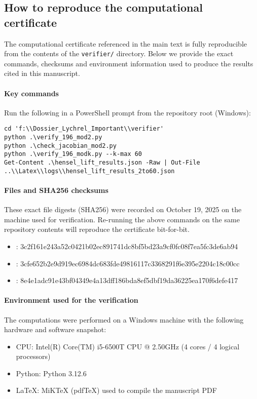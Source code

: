 \documentclass[12pt,a4paper]{article}
\begin{document}
\subsection*{How to reproduce the computational certificate}
The computational certificate referenced in the main text is fully reproducible
from the contents of the \texttt{verifier/} directory. Below we provide the
exact commands, checksums and environment information used to produce the
results cited in this manuscript.

\paragraph{Key commands}
Run the following in a PowerShell prompt from the repository root (Windows):
\begin{verbatim}
cd 'f:\\Dossier_Lychrel_Important\\verifier'
python .\verify_196_mod2.py
python .\check_jacobian_mod2.py
python .\verify_196_modk.py --k-max 60
Get-Content .\hensel_lift_results.json -Raw | Out-File ..\\Latex\\logs\\hensel_lift_results_2to60.json
\end{verbatim}

\paragraph{Files and SHA256 checksums}
These exact file digests (SHA256) were recorded on October 19, 2025 on the
machine used for verification. Re-running the above commands on the same
repository contents will reproduce the certificate bit-for-bit.
\begin{itemize}
\item \texttt{}: 3c2f161e243a52c0421b02ec891741dc8bf5bd23a9cf0fc08f7ea5fc3de6ab94
\item \texttt{}: 3cfe652b2e9d919ec6984dc683fde49816117c3368291f6e395e2204c18c00cc
\item \texttt{}: 8e4e1adc91e43bf04349e4a13dff186bda8ef5dbf19da36225ea170f6defe417
\end{itemize}

\paragraph{Environment used for the verification}
The computations were performed on a Windows machine with the following
hardware and software snapshot:
\begin{itemize}
\item CPU: Intel(R) Core(TM) i5-6500T CPU @ 2.50GHz (4 cores / 4 logical processors)
\item Python: Python 3.12.6
\item LaTeX: MiKTeX (pdfTeX) used to compile the manuscript PDF
\end{itemize}
\end{document}
